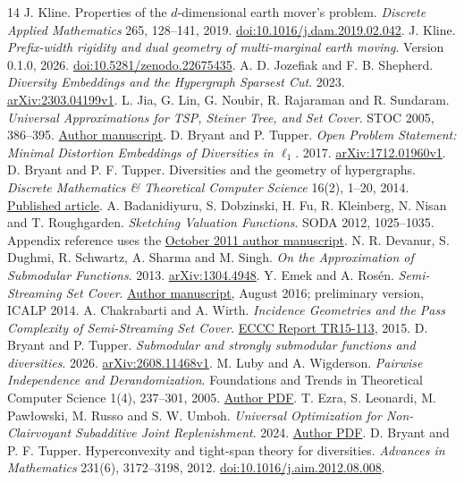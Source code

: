 \documentclass[11pt]{article}
\begin{document}
\clearpage
\begin{thebibliography}{14}\small
{} J. Kline.
Properties of the $d$-dimensional earth mover's problem.
\emph{Discrete Applied Mathematics} 265, 128--141, 2019.
\href{https://doi.org/10.1016/j.dam.2019.02.042}{doi:10.1016/j.dam.2019.02.042}.
 J. Kline.
\emph{Prefix-width rigidity and dual geometry of multi-marginal earth moving}.
Version 0.1.0, 2026.
\href{https://doi.org/10.5281/zenodo.22675435}{doi:10.5281/zenodo.22675435}.
 A. D. Jozefiak and F. B. Shepherd.
\emph{Diversity Embeddings and the Hypergraph Sparsest Cut}.
2023. \href{https://arxiv.org/abs/2303.04199v1}{arXiv:2303.04199v1}.
 L. Jia, G. Lin, G. Noubir, R. Rajaraman and R. Sundaram.
\emph{Universal Approximations for TSP, Steiner Tree, and Set Cover}.
STOC 2005, 386--395.
\href{https://www.khoury.northeastern.edu/~koods/papers/jia05universal.pdf}{Author manuscript}.
 D. Bryant and P. Tupper.
\emph{Open Problem Statement: Minimal Distortion Embeddings of Diversities in $\ell_1$}.
2017. \href{https://arxiv.org/abs/1712.01960v1}{arXiv:1712.01960v1}.
 D. Bryant and P. F. Tupper.
Diversities and the geometry of hypergraphs.
\emph{Discrete Mathematics \& Theoretical Computer Science} 16(2), 1--20, 2014.
\href{https://dmtcs.episciences.org/2080}{Published article}.
 A. Badanidiyuru, S. Dobzinski, H. Fu, R. Kleinberg,
N. Nisan and T. Roughgarden. \emph{Sketching Valuation Functions}.
SODA 2012, 1025--1035. Appendix reference uses the
\href{https://timroughgarden.org/papers/approxxos.pdf}{October 2011 author manuscript}.
 N. R. Devanur, S. Dughmi, R. Schwartz, A. Sharma and M. Singh.
\emph{On the Approximation of Submodular Functions}. 2013.
\href{https://arxiv.org/abs/1304.4948}{arXiv:1304.4948}.
 Y. Emek and A. Ros\'en. \emph{Semi-Streaming Set Cover}.
\href{https://www.irif.fr/~adiro/publ/ER.pdf}{Author manuscript}, August 2016;
preliminary version, ICALP 2014.
 A. Chakrabarti and A. Wirth.
\emph{Incidence Geometries and the Pass Complexity of Semi-Streaming Set Cover}.
\href{https://eccc.weizmann.ac.il/report/2015/113/}{ECCC Report TR15-113}, 2015.
 D. Bryant and P. Tupper.
\emph{Submodular and strongly submodular functions and diversities}. 2026.
\href{https://arxiv.org/abs/2608.11468v1}{arXiv:2608.11468v1}.
 M. Luby and A. Wigderson.
\emph{Pairwise Independence and Derandomization}.
Foundations and Trends in Theoretical Computer Science 1(4), 237--301, 2005.
\href{https://www.ias.edu/sites/default/files/math/csdm/05-06/mluby_pairwise_independence_and_derandomization.pdf}{Author PDF}.
 T. Ezra, S. Leonardi, M. Paw{\l}owski, M. Russo and S. W. Umboh.
\emph{Universal Optimization for Non-Clairvoyant Subadditive Joint Replenishment}.
2024. \href{https://michalpawlowski.github.io/michal-academic/publications/pdfs/03_full_paper.pdf}{Author PDF}.
 D. Bryant and P. F. Tupper.
Hyperconvexity and tight-span theory for diversities.
\emph{Advances in Mathematics} 231(6), 3172--3198, 2012.
\href{https://doi.org/10.1016/j.aim.2012.08.008}{doi:10.1016/j.aim.2012.08.008}.
\end{thebibliography}
\end{document}
